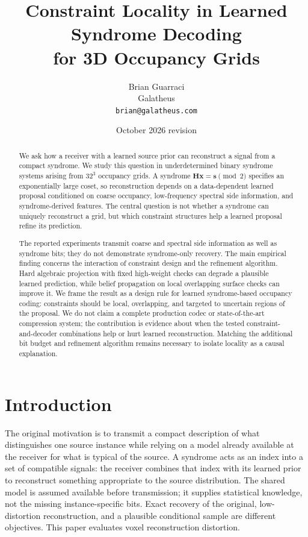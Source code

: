 \documentclass[11pt,a4paper]{article}
\title{Constraint Locality in Learned Syndrome Decoding\\for 3D Occupancy Grids}
\author{Brian Guarraci\\
  Galatheus\\
  \texttt{brian@galatheus.com}}
\date{October 2026 revision}
\begin{document}
\maketitle

\begin{abstract}
We ask how a receiver with a learned source prior can reconstruct a
signal from a compact syndrome. We study this question in underdetermined
binary syndrome systems arising from $32^3$ occupancy grids. A syndrome
$\mathbf{H}\mathbf{x}=\mathbf{s}\pmod 2$ specifies an exponentially large
coset, so reconstruction depends on a data-dependent learned proposal
conditioned on coarse occupancy, low-frequency spectral side information,
and syndrome-derived features. The central question is not whether a
syndrome can uniquely reconstruct a grid, but which constraint structures
help a learned proposal refine its prediction.

The reported experiments transmit coarse and spectral side information
as well as syndrome bits; they do not demonstrate syndrome-only recovery.
The main empirical finding concerns the interaction of constraint design
and the refinement algorithm. Hard algebraic
projection with fixed high-weight checks can degrade a plausible learned
prediction, while belief propagation on local overlapping surface checks can
improve it. We frame the result as a design rule for learned syndrome-based
occupancy coding: constraints should be local, overlapping, and targeted to
uncertain regions of the proposal. We do not claim a complete production codec
or state-of-the-art compression system; the contribution is evidence about when the tested constraint-and-decoder
combinations help or hurt learned reconstruction. Matching the additional
bit budget and refinement algorithm remains necessary to isolate locality
as a causal explanation.
\end{abstract}

\section{Introduction}

The original motivation is to transmit a compact description of what
distinguishes one source instance while relying on a model already available
at the receiver for what is typical of the source. A syndrome acts as an
index into a set of compatible signals: the receiver combines that index
with its learned prior to reconstruct something appropriate to the source
distribution. The shared model is assumed available before transmission;
it supplies statistical knowledge, not the missing instance-specific bits.
Exact recovery of the original, low-distortion reconstruction, and a
plausible conditional sample are different objectives. This paper evaluates
voxel reconstruction distortion.
\end{document}
